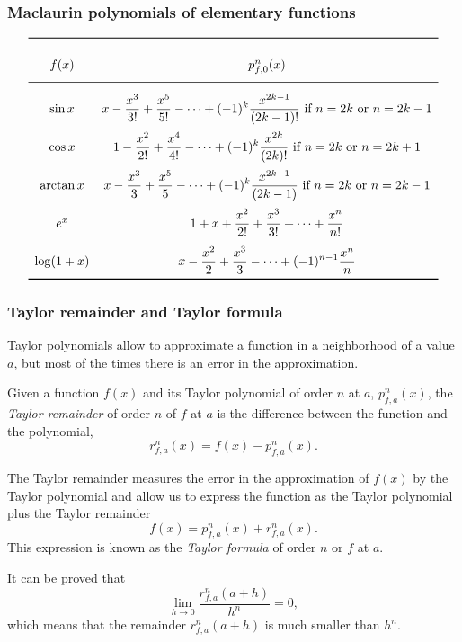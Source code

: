 \begin{frame}
\frametitle{Maclaurin polynomials of elementary functions}
\[
\renewcommand{\arraystretch}{2.5}
\begin{array}{cc}
\toprule
f(x) & p_{f,0}^n(x) \\
\midrule
\sin x & \displaystyle x - \frac{x^3}{3!} + \frac{x^5}{5!} - \cdots + (-1)^k\frac{x^{2k-1}}{(2k-1)!} \mbox{ if $n=2k$ or $n=2k-1$}\\
\cos x &  \displaystyle 1 - \frac{x^2}{2!} + \frac{x^4}{4!} - \cdots + (-1)^k\frac{x^{2k}}{(2k)!} \mbox{ if $n=2k$ or $n=2k+1$}\\
\arctan x &  \displaystyle x - \frac{x^3}{3} + \frac{x^5}{5} - \cdots + (-1)^k\frac{x^{2k-1}}{(2k-1)} \mbox{ if $n=2k$ or $n=2k-1$}\\
e^x & \displaystyle 1 + x + \frac{x^2}{2!} + \frac{x^3}{3!} + \cdots + \frac{x^n}{n!}\\
\log(1+x) & \displaystyle x - \frac{x^2}{2} + \frac{x^3}{3} - \cdots + (-1)^{n-1}\frac{x^n}{n}\\
\bottomrule
\end{array}
\]
\end{frame}


\begin{frame}
\frametitle{Taylor remainder and Taylor formula}
Taylor polynomials allow to approximate a function in a neighborhood of a value $a$, but most of the times there is an error in the approximation.
\begin{definition}
Given a function  $f(x)$ and its Taylor polynomial of order $n$ at $a$, $p_{f,a}^n(x)$, the \emph{Taylor remainder} of order $n$ of $f$ at $a$ is the difference between the function and the polynomial,
\[
r_{f,a}^n(x)=f(x)-p_{f,a}^n(x).
\]
\end{definition}

The Taylor remainder measures the error in the approximation of $f(x)$ by the Taylor polynomial and allow us to express the function as the Taylor polynomial plus the Taylor remainder
\[
f(x)=p_{f,a}^n(x) + r_{f,a}^n(x).
\]
This expression is known as the \emph{Taylor formula} of order $n$ or $f$ at $a$. 

It can be proved that
\[
\lim_{h\rightarrow 0}\frac{r_{f,a}^n(a+h)}{h^n}=0,
\]
which means that the remainder $r_{f,a}^n(a+h)$ is much smaller than $h^n$.
\end{frame}




